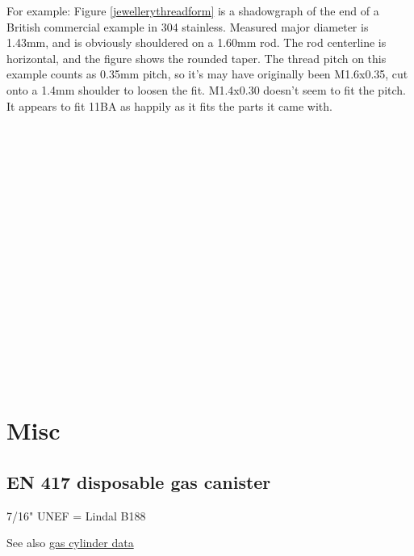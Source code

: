 For example: Figure \ref{jewellerythreadform} is a shadowgraph of the end of a British commercial example in 304 stainless.  Measured major diameter is 1.43mm, and is obviously shouldered on a 1.60mm rod. The rod centerline is horizontal, and the figure shows the rounded taper.  The thread pitch on this example counts as 0.35mm pitch, so it's may have originally been M1.6x0.35, cut onto a 1.4mm shoulder to loosen the fit.  M1.4x0.30 doesn't seem to fit the pitch.  It appears to fit 11BA as happily as it fits the parts it came with.
\\ \\ \\ \\ \\ \\ \\ \\ \\ \\ \\ \\ \\ \\ \\ \\ \\ \\               



\clearpage
\section{Misc}
\subsection{EN 417 disposable gas canister}\label{gas_cylinder_threads}
7/16" UNEF = Lindal B188 

See also \hyperref[gas_cylinders]{gas cylinder data}

\clearpage
